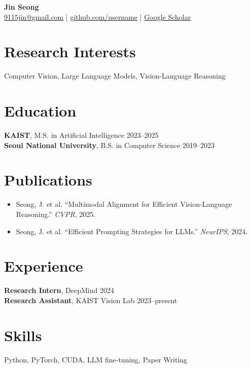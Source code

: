 \documentclass[11pt]{article}
\begin{document}
\begin{center}
    {\LARGE \textbf{Jin Seong}}\\[4pt]
    \href{mailto:9115jin@gmail.com}{9115jin@gmail.com} \;|\;
    \href{https://github.com/username}{github.com/username} \;|\;
    \href{https://scholar.google.com/}{Google Scholar}
\end{center}

\section*{Research Interests}
Computer Vision, Large Language Models, Vision-Language Reasoning

\section*{Education}
\textbf{KAIST}, M.S. in Artificial Intelligence \hfill 2023--2025\\
\textbf{Seoul National University}, B.S. in Computer Science \hfill 2019--2023

\section*{Publications}
\begin{itemize}
    \item Seong, J. et al. ``Multimodal Alignment for Efficient Vision-Language Reasoning.'' \textit{CVPR}, 2025.
    \item Seong, J. et al. ``Efficient Prompting Strategies for LLMs.'' \textit{NeurIPS}, 2024.
\end{itemize}

\section*{Experience}
\textbf{Research Intern}, DeepMind \hfill 2024\\
\textbf{Research Assistant}, KAIST Vision Lab \hfill 2023--present

\section*{Skills}
Python, PyTorch, CUDA, LLM fine-tuning, Paper Writing
\end{document}
